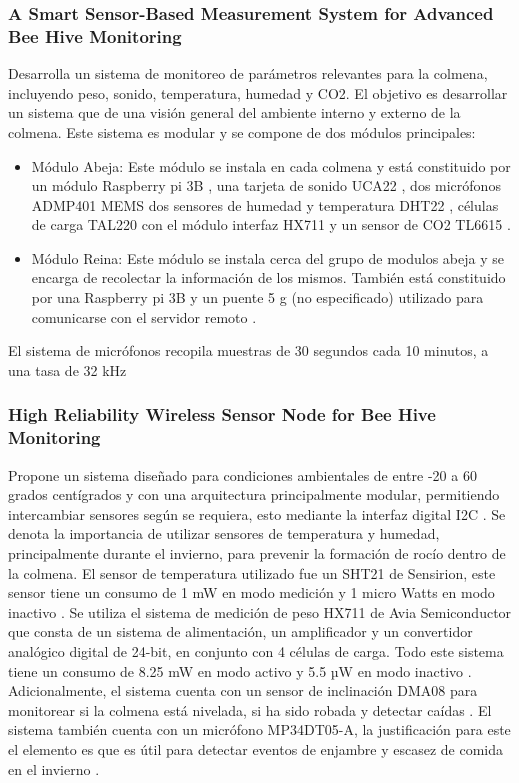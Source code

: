 \documentclass[journal]{IEEEtran} %
\begin{document}
\subsubsection{A Smart Sensor-Based Measurement System for Advanced Bee Hive Monitoring}
Desarrolla un sistema de monitoreo de parámetros relevantes para la colmena, incluyendo peso, sonido, temperatura, humedad y CO2. El objetivo es desarrollar un sistema que de una visión general del ambiente interno y externo de la colmena.
Este sistema es modular y se compone de dos módulos principales:
\begin{itemize}
    \item Módulo Abeja: Este módulo se instala en cada colmena y está constituido por un módulo Raspberry pi 3B \cite{BuyPi}, una tarjeta de sonido UCA22 \cite{BehringerUCA222}, dos micrófonos ADMP401 MEMS \cite{ADMP401Devices} dos sensores de humedad y temperatura DHT22 \cite{LiuDigital-outputModule/sensor}, células de carga TAL220 \cite{LoadElectronics} con el módulo interfaz HX711\cite{HX711Electronics} y un sensor de CO2 TL6615 \cite{T6615Telaire}.
    \item Módulo Reina: Este módulo se instala cerca del grupo de modulos abeja y se encarga de recolectar la información de los mismos. También está constituido por una Raspberry pi 3B y un puente 5 g (no especificado) utilizado para comunicarse con el servidor remoto \cite{Cecchi2020AMonitoring}.
\end{itemize}
El sistema de micrófonos recopila muestras de 30 segundos cada 10 minutos, a una tasa de 32 kHz

\subsubsection{High Reliability Wireless Sensor Node for Bee Hive Monitoring}
Propone un sistema diseñado para condiciones ambientales de entre -20 a 60 grados centígrados y con una arquitectura principalmente modular, permitiendo intercambiar sensores según se requiera, esto mediante la interfaz digital I2C \cite{Vidrascu2016HighMonitoring}.
Se denota la importancia de utilizar sensores de temperatura y humedad, principalmente durante el invierno, para prevenir la formación de rocío dentro de la colmena. El sensor de temperatura utilizado fue un SHT21 de Sensirion, este sensor tiene un consumo de 1 mW en modo medición y 1 micro Watts en modo inactivo \cite{Vidrascu2016HighMonitoring}.
Se utiliza el sistema de medición de peso HX711 de Avia Semiconductor que consta de un sistema de alimentación, un amplificador y un convertidor analógico digital de 24-bit, en conjunto con 4 células de carga. Todo este sistema tiene un consumo de 8.25 mW en modo activo y 5.5 µW en modo inactivo \cite{Vidrascu2016HighMonitoring}.
Adicionalmente, el sistema cuenta con un sensor de inclinación DMA08 para monitorear si la colmena está nivelada, si ha sido robada y detectar caídas \cite{Vidrascu2016HighMonitoring}.
El sistema también cuenta con un micrófono MP34DT05-A, la justificación para este el elemento es que es útil para detectar eventos de enjambre y escasez de comida en el invierno \cite{Vidrascu2016HighMonitoring}.
\end{document}
